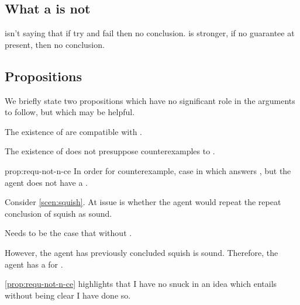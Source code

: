 \subsection{What a \requ{} is not}

\begin{note}
  \requ{} isn't saying that if try and fail then no conclusion.
  \requ{} is stronger, if no guarantee at present, then no conclusion.
\end{note}

\subsection{Propositions}
\label{sec:propsoitions}

\begin{note}
  We briefly state two propositions which have no significant role in the arguments to follow, but which may be helpful.
\end{note}

\begin{note}
  The existence of  are compatible with \issueConstraint{}.
  \begin{proposition}
    \label{prop:requ-not-n-ce}
    The existence of  does not presuppose counterexamples to \issueConstraint{}.
  \end{proposition}
  \begin{argument}{prop:requ-not-n-ce}
    In order for counterexample, case in which \ros{} answers \qWhyV{}, but the agent does not have a \wit{}.

    Consider \autoref{scen:squish}.
    At issue is whether the agent would repeat the repeat conclusion of squish as sound.

    Needs to be the case that \ros{} without \wit{}.

    However, the agent has previously concluded squish is sound.
    Therefore, the agent has a \wit{} for \ros{}.
  \end{argument}

  \autoref{prop:requ-not-n-ce} highlights that I have no snuck in an idea which entails \issueConstraint{} without being clear I have done so.
\end{note}

